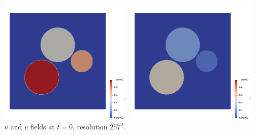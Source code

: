 \begin{center}
\includegraphics[height=6cm]{python_codes/fieldstone_171/RKtest1/u0}
\includegraphics[height=6cm]{python_codes/fieldstone_171/RKtest1/v0}\\
{\captionfont $u$ and $v$ fields at $t=0$, resolution $257^2$.}
\end{center}



